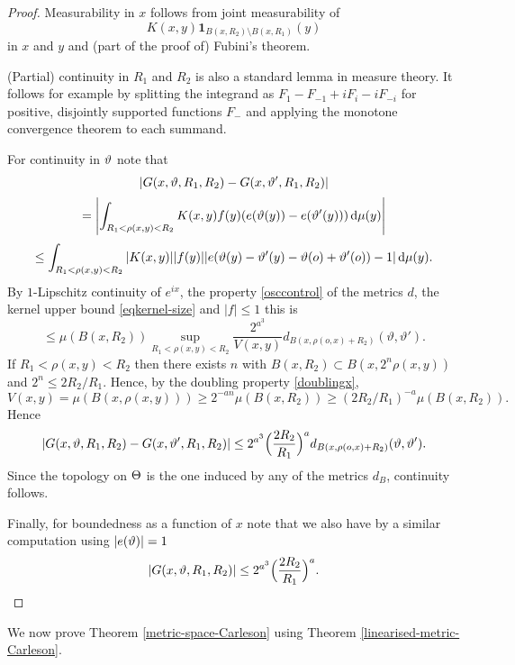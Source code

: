 \begin{proof}
    \leanok
    Measurability in $x$ follows from joint measurability of
    \[
        K(x,y) \mathbf{1}_{B(x,R_2) \setminus B(x,R_1)}(y)
    \]
    in $x$ and $y$ and (part of the proof of) Fubini's theorem.

    (Partial) continuity in $R_1$ and $R_2$ is also a standard lemma in measure theory. It follows for example by splitting the integrand as $F_1 - F_{-1} + iF_i - iF_{-i}$ for positive, disjointly supported functions $F_{-}$ and applying the monotone convergence theorem to each summand.

    For continuity in ${\vartheta}$ note that
    \[
        |G(x, {\vartheta}, R_1, R_2) - G(x, {\vartheta}', R_1, R_2)|
    \]
    \[
        = \left| \int_{R_1 < \rho(x,y) < R_2} K(x,y) f(y) (e({\vartheta}(y)) - e({\vartheta}'(y))) \, \mathrm{d}\mu(y) \right|
    \]
    \[
        \le \int_{R_1 < \rho(x,y) < R_2} |K(x,y)| |f(y)| |e({\vartheta}(y) - {\vartheta}'(y) - {\vartheta}(o) + {\vartheta}'(o)) - 1| \, \mathrm{d}\mu(y).
    \]
    By $1$-Lipschitz continuity of $e^{ix}$, the property \eqref{osccontrol} of the metrics $d$, the kernel upper bound \eqref{eqkernel-size} and $|f| \le 1$ this is
    \[
        \le \mu(B(x, R_2)) \sup_{R_1 < \rho(x,y) < R_2} \frac{2^{a^3}}{V(x,y)} d_{B(x,\rho(o,x)+R_2)}(\vartheta, \vartheta').
    \]
    If $R_1 < \rho(x,y) < R_2$ then there exists $n$ with $B(x,R_2) \subset B(x, 2^n \rho(x,y))$ and $2^n \le 2 R_2/R_1$. Hence, by the doubling property \eqref{doublingx},
    \[
        V(x,y) = \mu(B(x, \rho(x,y))) \ge 2^{-an} \mu(B(x, R_2)) \ge (2R_2 / R_1)^{-a} \mu(B(x, R_2)).
    \]
    Hence
    \[
        |G(x, {\vartheta}, R_1, R_2) - G(x, {\vartheta}', R_1, R_2)| \le 2^{a^3} \Big(\frac{2R_2}{R_1}\Big)^a d_{B(x, \rho(o,x)+R_2)}({\vartheta}, {\vartheta}').
    \]
    Since the topology on ${\Theta}$ is the one induced by any of the metrics $d_B$, continuity follows.

    Finally, for boundedness as a function of $x$ note that we also have by a similar computation using $|e({\vartheta})|=1$
    \[
        |G(x, {\vartheta}, R_1, R_2)| \le 2^{a^3} \Big(\frac{2R_2}{R_1}\Big)^a.
    \]
\end{proof}

We now prove Theorem \ref{metric-space-Carleson} using Theorem \ref{linearised-metric-Carleson}.

